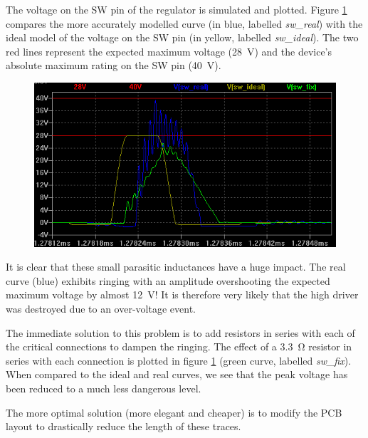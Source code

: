 The voltage on the SW pin of the regulator  is  simulated  and  plotted.  Figure
\ref{fig:verification:long_traces_simulation}  compares  the   more   accurately
modelled curve (in blue, labelled \emph{sw\_real})  with  the ideal model of the
voltage on the SW pin (in yellow, labelled \emph{sw\_ideal}). The  two red lines
represent  the  expected  maximum  voltage  (\SI{28}{\volt})  and  the  device's
absolute maximum rating on the SW pin (\SI{40}{\volt}).

\begin{figure}[th!]
    \centering
    \includegraphics[width=.7\textwidth]{images/sim/lt3741-transients-sim.png}
    \caption{}
    \label{fig:verification:long_traces_simulation}
\end{figure}

It is clear that these small parasitic  inductances have a huge impact. The real
curve  (blue) exhibits ringing  with  an  amplitude  overshooting  the  expected
maximum voltage by  almost  \SI{12}{\volt}! It is therefore very likely that the
high driver was destroyed due to an over-voltage event.

The immediate solution to this problem  is  to add resistors in series with each
of  the  critical  connections  to  dampen  the  ringing.  The   effect   of   a
\SI{3.3}{\ohm} resistor in series  with  each  connection  is  plotted in figure
\ref{fig:verification:long_traces_simulation}     (green     curve,     labelled
\emph{sw\_fix}). When compared  to  the  ideal  and real curves, we see that the
peak voltage has been reduced to a much less dangerous level.

The more  optimal solution  (more elegant  and cheaper) is  to modify  the PCB
layout to drastically reduce the length of these traces.
